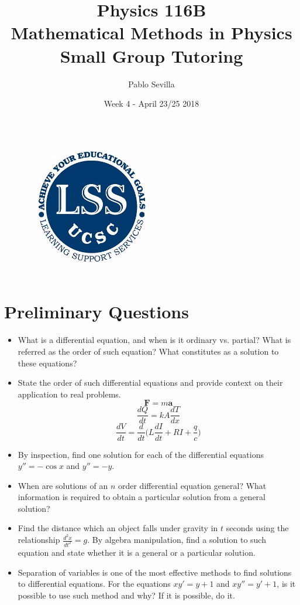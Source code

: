 \documentclass{article}
\title{Physics 116B \\ Mathematical Methods in Physics\\ Small Group Tutoring}
\author{Pablo Sevilla}
\date{Week 4 - April 23/25 2018}
\begin{document}
\maketitle

\begin{figure}[h]
\centering
\includegraphics[scale=0.3]{lss}
\end{figure}
\section{Preliminary Questions}
 \begin{itemize}
  \item What is a differential equation, and when is it ordinary vs. partial? What is referred as the order of such equation? What constitutes as a solution to these equations?
  \item State the order of such differential equations and provide context on their application to real problems.
  \begin{equation}
      \bm{F}=m\bm{a}
  \end{equation} 
  \begin{equation}
      \frac{dQ}{dt}=kA\frac{dT}{dx}
  \end{equation}
  \begin{equation}
      \frac{dV}{dt}=\frac{d}{dt}\Bigg(L\frac{dI}{dt}+RI+\frac{q}{c}\Bigg)
  \end{equation}
  
  \item By inspection, find one solution for each of the differential equations $y''=-\cos{x}$ and $y''=-y$.
  \item When are solutions of an $n$ order differential equation general? What information is required to obtain a particular solution from a general solution?
  \item Find the distance which an object falls under gravity in $t$ seconds using the relationship $\frac{d^2x}{dt^2}=g$. By algebra manipulation, find a solution to such equation and state whether it is a general or a particular solution.
  \item Separation of variables is one of the most effective methods to find solutions to differential equations. For the equations $xy'=y+1$ and $xy''=y'+1$, is it possible to use such method and why? If it is possible, do it.
 \end{itemize}
\end{document}
